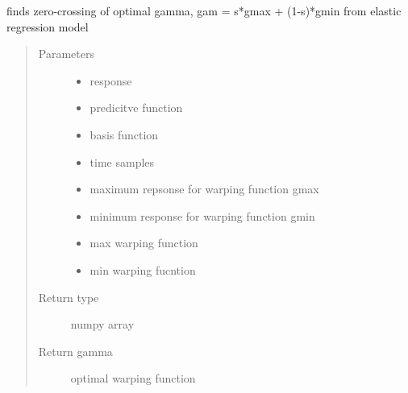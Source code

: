 \documentclass[letterpaper,10pt,english]{sphinxmanual}
\begin{document}
\begin{fulllineitems}
\label{\detokenize{utility_functions:utility_functions.zero_crossing}}
finds zero-crossing of optimal gamma, gam = s*gmax + (1-s)*gmin
from elastic regression model
\begin{quote}\begin{description}
\item[{Parameters}] \leavevmode\begin{itemize}
\item {} 
 \textendash{} response

\item {} 
 \textendash{} predicitve function

\item {} 
 \textendash{} basis function

\item {} 
 \textendash{} time samples

\item {} 
 \textendash{} maximum repsonse for warping function gmax

\item {} 
 \textendash{} minimum response for warping function gmin

\item {} 
 \textendash{} max warping function

\item {} 
 \textendash{} min warping fucntion

\end{itemize}

\item[{Return type}] \leavevmode
numpy array

\item[{Return gamma}] \leavevmode
optimal warping function

\end{description}\end{quote}

\end{fulllineitems}
\end{document}
